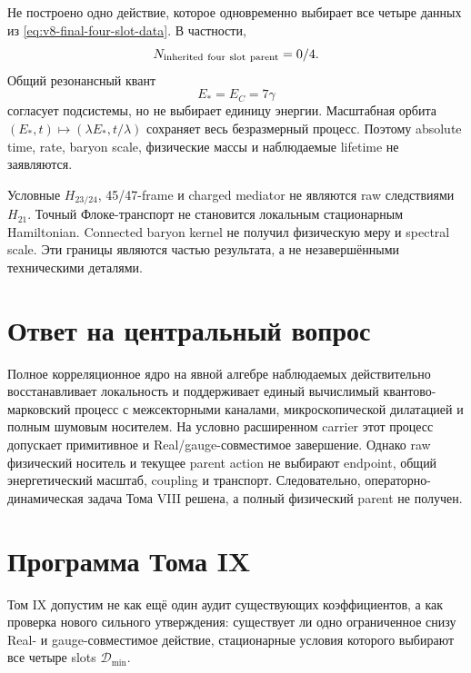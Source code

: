 Не построено одно действие, которое одновременно выбирает все четыре
данных из \eqref{eq:v8-final-four-slot-data}. В частности,
\begin{equation}
 N_{\rm inherited\ four\ slot\ parent}=0/4.
 \label{eq:v8-final-parent-ledger}
\end{equation}
Общий резонансный квант
\begin{equation}
 E_*=E_C=7\gamma
 \label{eq:v8-final-common-energy}
\end{equation}
согласует подсистемы, но не выбирает единицу энергии. Масштабная орбита
$(E_*,t)\mapsto(\lambda E_*,t/\lambda)$ сохраняет весь безразмерный
процесс. Поэтому absolute time, rate, baryon scale, физические массы и
наблюдаемые lifetime не заявляются.

Условные $H_{23/24}$, 45/47-frame и charged mediator не являются raw
следствиями $H_{21}$. Точный Флоке-транспорт не становится локальным
стационарным Hamiltonian. Connected baryon kernel не получил физическую
меру и spectral scale. Эти границы являются частью результата, а не
незавершёнными техническими деталями.

\section{Ответ на центральный вопрос}

\begin{theorem}
Полное корреляционное ядро на явной алгебре наблюдаемых действительно
восстанавливает локальность и поддерживает единый вычислимый
квантово-марковский процесс с межсекторными каналами, микроскопической
дилатацией и полным шумовым носителем. На условно расширенном carrier этот
процесс допускает примитивное и Real/gauge-совместимое завершение. Однако
raw физический носитель и текущее parent action не выбирают endpoint,
общий энергетический масштаб, coupling и транспорт. Следовательно,
операторно-динамическая задача Тома VIII решена, а полный физический parent
не получен.
\end{theorem}

\section{Программа Тома IX}

Том IX допустим не как ещё один аудит существующих коэффициентов, а как
проверка нового сильного утверждения: существует ли одно ограниченное снизу
Real- и gauge-совместимое действие, стационарные условия которого выбирают
все четыре slots $\mathcal D_{\min}$.

